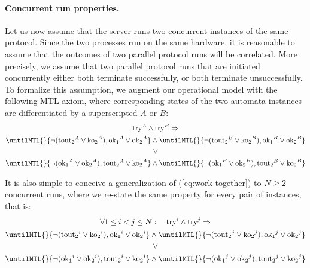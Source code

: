 \documentclass[a4paper]{article}
\newcommand{\tait}[1]{\mathrm{#1}}
\newcommand{\try}{\tait{try}}
\newcommand{\ok}{\tait{ok_1}}
\newcommand{\okk}{\tait{ok_2}}
\newcommand{\koo}{\tait{ko_2}}
\newcommand{\toutt}{\tait{tout_2}}
\newcommand{\frf}[1]{(\ref{#1})}
\theoremstyle{plain}
\theoremstyle{definition}
\begin{document}
\paragraph{Concurrent run properties.}
Let us now assume that the server runs two concurrent instances of the same protocol.
Since the two processes run on the same hardware, it is reasonable to assume that the outcomes of two parallel protocol runs will be correlated.
More precisely, we assume that two parallel protocol runs that are initiated concurrently either both terminate successfully, or both terminate unsuccessfully.
To formalize this assumption, we augment our operational model with the following MTL axiom, where corresponding states of the two automata instances are differentiated by a superscripted $A$ or $B$:
\begin{multline} \label{eq:work-together}
 \try^A \wedge \try^B \Rightarrow \\
\untilMTL{}{\neg(\toutt^A \vee \koo^A), \ok^A \vee \okk^A} \wedge \untilMTL{}{\neg(\toutt^B \vee \koo^B), \ok^B \vee \okk^B} \\
\vee \\
 \untilMTL{}{\neg(\ok^A \vee \okk^A), \toutt^A \vee \koo^A} \wedge \untilMTL{}{\neg(\ok^B \vee \okk^B), \toutt^B \vee \koo^B}
\end{multline}

It is also simple to conceive a generalization of \frf{eq:work-together} to $N \geq 2$ concurrent runs, where we re-state the same property for every pair of instances, that is:
\begin{multline} \label{eq:work-togeter-multiple}
\forall 1 \leq i < j \leq N:
 \quad \try^i \wedge \try^j \Rightarrow \\
\untilMTL{}{\neg(\toutt^i \vee \koo^i), \ok^i \vee \okk^i} \wedge \untilMTL{}{\neg(\toutt^j \vee \koo^j), \ok^j \vee \okk^j} \\
\vee \\
 \untilMTL{}{\neg(\ok^i \vee \okk^i), \toutt^i \vee \koo^i} \wedge \untilMTL{}{\neg(\ok^j \vee \okk^j), \toutt^j \vee \koo^j}
\end{multline}
\end{document}
